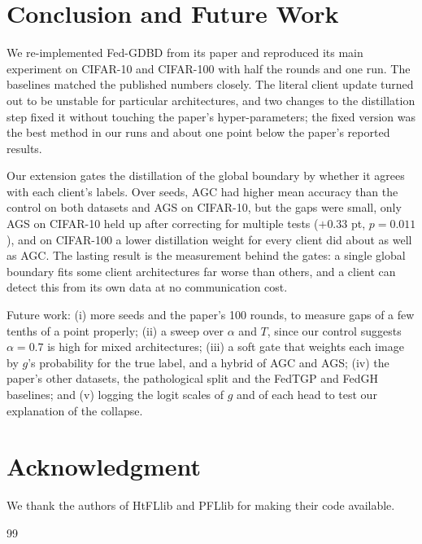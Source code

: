 \documentclass[conference]{IEEEtran}
\begin{document}
\section{Conclusion and Future Work}

We re-implemented Fed-GDBD from its paper and reproduced its main experiment on CIFAR-10 and CIFAR-100 with half the rounds and one run. The baselines matched the published numbers closely. The literal client update turned out to be unstable for particular architectures, and two changes to the distillation step fixed it without touching the paper's hyper-parameters; the fixed version was the best method in our runs and about one point below the paper's reported results.

Our extension gates the distillation of the global boundary by whether it agrees with each client's labels. Over \NSeeds{} seeds, AGC had higher mean accuracy than the control on both datasets and AGS on CIFAR-10, but the gaps were small, only AGS on CIFAR-10 held up after correcting for multiple tests ($+0.33$ pt, $p=0.011$), and on CIFAR-100 a lower distillation weight for every client did about as well as AGC. The lasting result is the measurement behind the gates: a single global boundary fits some client architectures far worse than others, and a client can detect this from its own data at no communication cost.

Future work: (i) more seeds and the paper's 100 rounds, to measure gaps of a few tenths of a point properly; (ii) a sweep over $\alpha$ and $T$, since our control suggests $\alpha=0.7$ is high for mixed architectures; (iii) a soft gate that weights each image by $g$'s probability for the true label, and a hybrid of AGC and AGS; (iv) the paper's other datasets, the pathological split and the FedTGP and FedGH baselines; and (v) logging the logit scales of $g$ and of each head to test our explanation of the collapse.

\section*{Acknowledgment}
We thank the authors of HtFLlib and PFLlib for making their code available.

\begin{thebibliography}{99}

\end{thebibliography}

\appendices
\end{document}
